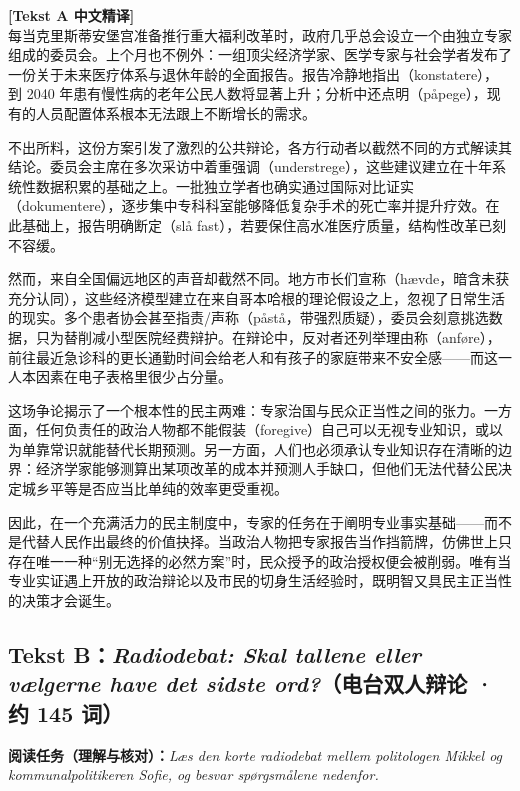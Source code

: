 \begin{transbox}
\small
\textbf{\color{NCDTeal}[Tekst A 中文精译]}\\
每当克里斯蒂安堡宫准备推行重大福利改革时，政府几乎总会设立一个由独立专家组成的委员会。上个月也不例外：一组顶尖经济学家、医学专家与社会学者发布了一份关于未来医疗体系与退休年龄的全面报告。报告冷静地指出（konstatere），到 2040 年患有慢性病的老年公民人数将显著上升；分析中还点明（påpege），现有的人员配置体系根本无法跟上不断增长的需求。

不出所料，这份方案引发了激烈的公共辩论，各方行动者以截然不同的方式解读其结论。委员会主席在多次采访中着重强调（understrege），这些建议建立在十年系统性数据积累的基础之上。一批独立学者也确实通过国际对比证实（dokumentere），逐步集中专科科室能够降低复杂手术的死亡率并提升疗效。在此基础上，报告明确断定（slå fast），若要保住高水准医疗质量，结构性改革已刻不容缓。

然而，来自全国偏远地区的声音却截然不同。地方市长们宣称（hævde，暗含未获充分认同），这些经济模型建立在来自哥本哈根的理论假设之上，忽视了日常生活的现实。多个患者协会甚至指责/声称（påstå，带强烈质疑），委员会刻意挑选数据，只为替削减小型医院经费辩护。在辩论中，反对者还列举理由称（anføre），前往最近急诊科的更长通勤时间会给老人和有孩子的家庭带来不安全感——而这一人本因素在电子表格里很少占分量。

这场争论揭示了一个根本性的民主两难：专家治国与民众正当性之间的张力。一方面，任何负责任的政治人物都不能假装（foregive）自己可以无视专业知识，或以为单靠常识就能替代长期预测。另一方面，人们也必须承认专业知识存在清晰的边界：经济学家能够测算出某项改革的成本并预测人手缺口，但他们无法代替公民决定城乡平等是否应当比单纯的效率更受重视。

因此，在一个充满活力的民主制度中，专家的任务在于阐明专业事实基础——而不是代替人民作出最终的价值抉择。当政治人物把专家报告当作挡箭牌，仿佛世上只存在唯一一种“别无选择的必然方案”时，民众授予的政治授权便会被削弱。唯有当专业实证遇上开放的政治辩论以及市民的切身生活经验时，既明智又具民主正当性的决策才会诞生。
\end{transbox}

\subsection*{Tekst B：\textit{Radiodebat: Skal tallene eller vælgerne have det sidste ord?}（电台双人辩论 · 约 145 词）}

\textbf{阅读任务（理解与核对）：}\textit{Læs den korte radiodebat mellem politologen Mikkel og kommunalpolitikeren Sofie, og besvar spørgsmålene nedenfor.}

